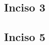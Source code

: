     \subsection{Inciso 3}
        
        \newpage
        
        
    \subsection{Inciso 5}
        
        \newpage